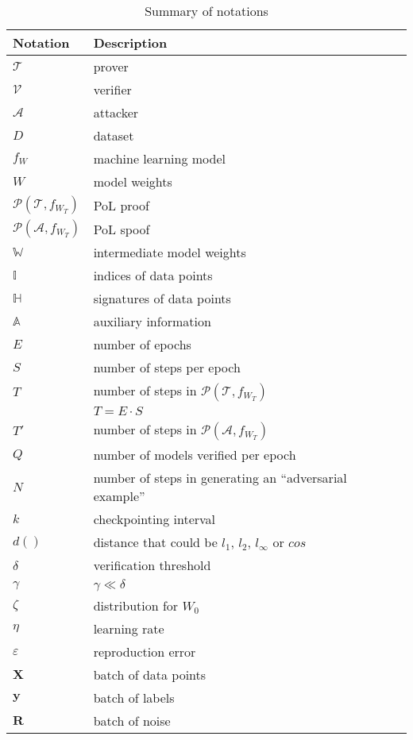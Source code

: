 \documentclass[conference]{IEEEtran}
\newcommand{\Prov}{\mathcal{T}\xspace}
\newcommand{\Verif}{\mathcal{V}\xspace}
\newcommand{\Adv}{\mathcal{A}\xspace}
\newcommand{\Proof}{\mathcal{P}\xspace}
\newcommand{\WWW}{\mathbb{W}\xspace}
\newcommand{\III}{\mathbb{I}\xspace}
\newcommand{\HHH}{\mathbb{H}\xspace}
\newcommand{\AAA}{\mathbb{A}\xspace}
\begin{document}
\begin{table}[ht]
\small
\centering
\caption{Summary of notations}
\begin{spacing}{1.30}
\begin{tabular}{p{1.75cm} p{5cm}}
\hline
\textbf{Notation} & \textbf{Description} \\ \hline
$\Prov$ & prover \\ \hline
$\Verif$ & verifier \\ \hline
$\Adv$ & attacker \\ \hline
$D$ & dataset \\ \hline
$f_{W}$ & machine learning model \\ \hline
${W}$ & model weights \\ \hline
$\Proof(\Prov, f_{W_T})$ & PoL proof \\ \hline
$\Proof(\Adv, f_{W_T})$ & PoL spoof \\ \hline
$\WWW$ & intermediate model weights  \\ \hline
$\III$ & indices of data points \\ \hline
$\HHH$ & signatures of data points  \\ \hline
$\AAA$ & auxiliary information \\ \hline
$E$ & number of epochs \\ \hline
$S$ & number of steps per epoch \\ \hline
$T$ & number of steps in $\Proof(\Prov, f_{W_T})$ \\ 
&$T = E \cdot S$ \\ \hline
$T'$ & number of steps in $\Proof(\Adv, f_{W_T})$ \\ \hline
$Q$ & number of models verified per epoch \\ \hline
$N$ & number of steps in generating an ``adversarial example'' \\ \hline
$k$ & checkpointing interval \\ \hline
$d()$ & distance that could be $l_1$, $l_2$, $l_{\infty}$ or $cos$ \\ \hline
$\delta$ & verification threshold \\ \hline
$\gamma$ & $\gamma \ll \delta$  \\ \hline
$\zeta$ & distribution for $W_0$ \\ \hline
$\eta$ & learning rate \\ \hline
$\varepsilon$ & reproduction error \\ \hline
$\mathbf{X}$ & batch of data points \\ \hline
$\mathbf{y}$ & batch of labels \\ \hline
$\mathbf{R}$ & batch of noise \\ \hline
\end{tabular}
\end{spacing}
\label{notationtable}
\vspace{-3mm}
\end{table}
\end{document}
